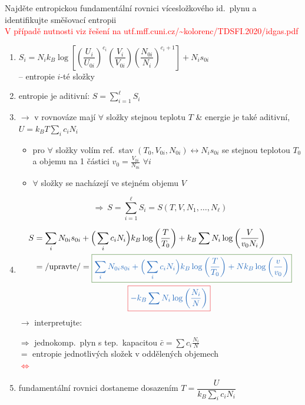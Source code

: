 \begin{priklad}[Příklad 4]
Najděte entropickou fundamentální rovnici vícesložkového id.\ plynu a identifikujte směšovací entropii \\
\textcolor{Red}{V případě nutnosti viz řešení na utf.mff.cuni.cz/\textasciitilde kolorenc/TDSFI.2020/idgas.pdf}
\end{priklad}
\begin{enumerate}[label=\arabic*),font=\color{NavyBlue}]\color{NavyBlue}
  \item $S_i = N_ik_B\log\left[\left(\dfrac{U_i}{U_{0i}}\right)^{c_i}\left(\dfrac{V_i}{V_{0i}}\right)\left(\dfrac{N_{0i}}{N_i}\right)^{c_i+1}\right] + N_is_{0i}$ \\
        -- entropie $i$-té složky
  \item entropie je aditivní: \quad $S = \sum_{i=1}^{\ell} S_i$
  \item $\to$ v rovnováze mají $\forall$ složky stejnou teplotu $T$ \& energie je také aditivní, $U = k_BT\sum_i c_iN_i$
  \begin{itemize}[label=$\to$]
    \item pro $\forall$ složky volím ref.\ stav $(T_0, V_{0i}, N_{0i}) \leftrightarrow N_is_{0i}$ se stejnou teplotou $T_0$ a objemu na 1 částici $v_0 = \frac{V_{0i}}{N_{0i}}$ $\forall i$
    \item $\forall$ složky se nacházejí ve stejném objemu $V$
  \end{itemize}
  \[ \Rightarrow\ S = \sum_{i=1}^{\ell} S_i = S(T, V, N_1, \dots, N_\ell) \]
  \item
  \begin{align*}
    S &= \sum_i N_{0i}s_{0i} + \Big(\sum_i c_iN_i\Big)k_B\log\left(\frac{T}{T_0}\right) + k_B\sum N_i\log\left(\frac{V}{v_0N_i}\right) \\
    &= /\text{upravte}/ =
    \textcolor{OliveGreen}{\boxed{\textcolor{NavyBlue}{\sum_i N_{0i}s_{0i} + \Big(\sum_i c_iN_i\Big)k_B\log\left(\frac{T}{T_0}\right) + Nk_B\log\left(\frac{v}{v_0}\right)}}} \\
    &\hspace*{4cm} \textcolor{Red}{\boxed{\textcolor{NavyBlue}{-k_B\sum N_i\log\left(\frac{N_i}{N}\right)}}}
  \end{align*}
  $\to$ interpretujte: \
  \begin{minipage}[t]{0.75\textwidth}
  \textcolor{OliveGreen}{$\Rightarrow$ jednokomp.\ plyn s tep.\ kapacitou $\bar c = \sum c_i\frac{N_i}{N}$ \\
  $=$ entropie jednotlivých složek v oddělených objemech} \\
  \textcolor{Red}{$\Leftrightarrow$ }
  \end{minipage}
  \item fundamentální rovnici dostaneme dosazením \quad $T = \dfrac{U}{k_B\sum_i c_iN_i}$
\end{enumerate}

